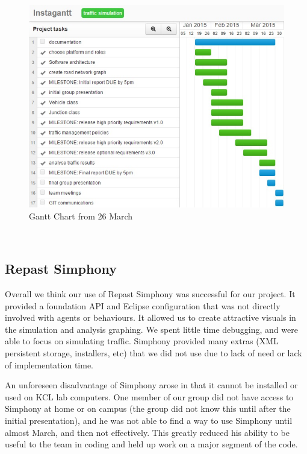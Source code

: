 \documentclass[11pt]{article}
\begin{document}
\begin{enumerate}
\begin{figure}
\begin{center}
\includegraphics[scale=0.6]{gantt26Mar}
\caption{Gantt Chart from 26 March}
\end{center}
\end{figure}
\\


\subsection{Repast Simphony}

Overall we think our use of Repast Simphony was successful for our project. It provided a foundation API and Eclipse configuration that was not directly involved with agents or behaviours. It allowed us to create attractive visuals in the simulation and analysis graphing. We spent little time debugging, and were able to focus on simulating traffic. Simphony provided many extras (XML persistent storage, installers, etc) that we did not use due to lack of need or lack of implementation time.

An unforeseen disadvantage of Simphony arose in that it cannot be installed or used on KCL lab computers. One member of our group did not have access to Simphony at home or on campus (the group did not know this until after the initial presentation), and he was not able to find a way to use Simphony until almost March, and then not effectively. This greatly reduced his ability to be useful to the team in coding and held up work on a major segment of the code.


\end{enumerate}
\end{document}
